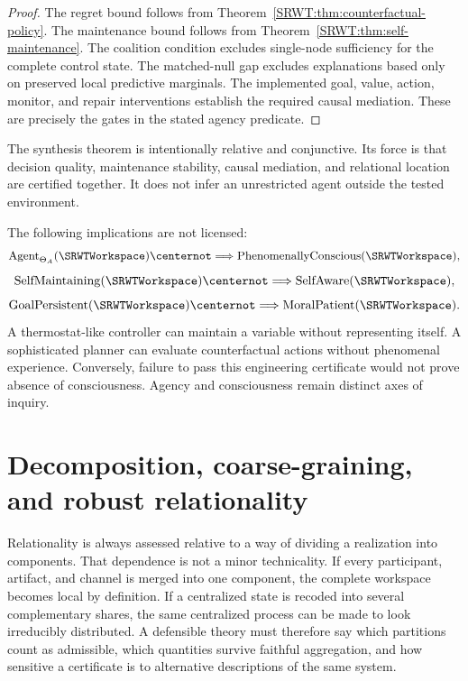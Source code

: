 \begin{proof}
The regret bound follows from
Theorem~\ref{SRWT:thm:counterfactual-policy}. The maintenance bound follows from
Theorem~\ref{SRWT:thm:self-maintenance}. The coalition condition excludes
single-node sufficiency for the complete control state. The matched-null gap
excludes explanations based only on preserved local predictive marginals. The
implemented goal, value, action, monitor, and repair interventions establish
the required causal mediation. These are precisely the gates in the stated
agency predicate.
\end{proof}

The synthesis theorem is intentionally relative and conjunctive. Its force is
that decision quality, maintenance stability, causal mediation, and relational
location are certified together. It does not infer an unrestricted agent
outside the tested environment.


The following implications are not licensed:
\[
\operatorname{Agent}_{\Theta_A}(\SRWTWorkspace)
\centernot\Longrightarrow
\operatorname{PhenomenallyConscious}(\SRWTWorkspace),
\]
\[
\operatorname{SelfMaintaining}(\SRWTWorkspace)
\centernot\Longrightarrow
\operatorname{SelfAware}(\SRWTWorkspace),
\]
\[
\operatorname{GoalPersistent}(\SRWTWorkspace)
\centernot\Longrightarrow
\operatorname{MoralPatient}(\SRWTWorkspace).
\]
A thermostat-like controller can maintain a variable without representing
itself. A sophisticated planner can evaluate counterfactual actions without
phenomenal experience. Conversely, failure to pass this engineering
certificate would not prove absence of consciousness. Agency and
consciousness remain distinct axes of inquiry.


\chapter{Decomposition, coarse-graining, and robust relationality}\label{SRWT:book:chapter-83}


Relationality is always assessed relative to a way of dividing a realization
into components. That dependence is not a minor technicality. If every
participant, artifact, and channel is merged into one component, the complete
workspace becomes local by definition. If a centralized state is recoded into
several complementary shares, the same centralized process can be made to look
irreducibly distributed. A defensible theory must therefore say which
partitions count as admissible, which quantities survive faithful aggregation,
and how sensitive a certificate is to alternative descriptions of the same
system.

